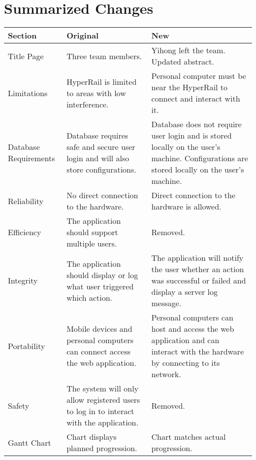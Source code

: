 \documentclass[onecolumn, draftclsnofoot,10pt, compsoc]{IEEEtran}
\begin{document}
\section{Summarized Changes}
\medskip
\begin{centering}

\begin{tabular}{|p{1in} | p{2.5in} | p{2.5in}|}
\hline
\textbf{Section} & \textbf{Original} & \textbf{New}\\\hline
Title Page & Three team members. & Yihong left the team. Updated abstract. \\\hline

Limitations & HyperRail is limited to areas with low interference. & Personal computer must be near the HyperRail to connect and interact with it.\\\hline

Database Requirements & Database requires safe and secure user login and will also store configurations. & Database does not require user login and is stored locally on the user's machine. Configurations are stored locally on the user's machine.\\\hline

Reliability & No direct connection to the hardware. & Direct connection to the hardware is allowed.\\\hline

Efficiency & The application should support multiple users. & Removed. \\\hline

Integrity & The application should display or log what user triggered which action. & The application will notify the user whether an action was successful or failed and display a server log message. \\\hline

Portability & Mobile devices and personal computers can connect access the web application. & Personal computers can host and access the web application and can interact with the hardware by connecting to its network. \\\hline

Safety & The system will only allow registered users to log in to interact with the application. & Removed. \\\hline

Gantt Chart & Chart displays planned progression. & Chart matches actual progression. \\\hline
\end{tabular}

\end{centering}
\end{document}
